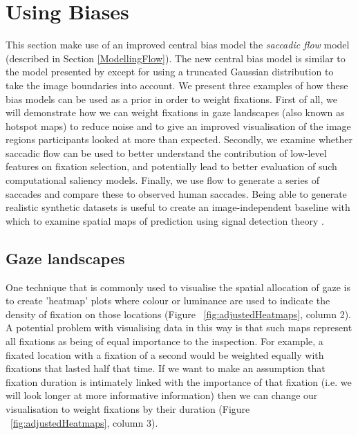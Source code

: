 
\section{Using Biases}
\label{sec:usingbiases}

This section make use of an improved central bias model the \textit{saccadic flow} model (described in Section \ref{ModellingFlow}). The new central bias model is similar to the model presented by \cite{clarke-tatler2014} except for using a truncated Gaussian distribution to take the image boundaries into account. We present three examples of how these bias models can be used as a prior in order to weight fixations. First of all, we will demonstrate how we can weight fixations in gaze landscapes (also known as hotspot maps) to reduce noise and to give an improved visualisation of the image regions participants looked at more than expected. Secondly, we examine whether saccadic flow can be used to better understand the contribution of low-level features on fixation selection, and potentially lead to better evaluation of such computational saliency models. Finally, we use flow to generate a series of saccades and compare these to observed human saccades. Being able to generate realistic synthetic datasets is useful to create an image-independent baseline with which to examine spatial maps of prediction using signal detection theory \citep[see][]{clarke-tatler2014}.


\subsection{Gaze landscapes}

One technique that is commonly used to visualise the spatial allocation of gaze is to create 'heatmap' plots where colour or luminance are used to indicate the density of fixation on those locations (Figure ~\ref{fig:adjustedHeatmaps}, column 2). A potential problem with visualising data in this way is that such maps represent all fixations as being of equal importance to the inspection. For example, a fixated location with a fixation of a second would be weighted equally with fixations that lasted half that time. If we want to make an assumption that fixation duration is intimately linked with the importance of that fixation (i.e. we will look longer at more informative information) then we can change our visualisation to weight fixations by their duration (Figure ~\ref{fig:adjustedHeatmaps}, column 3).

